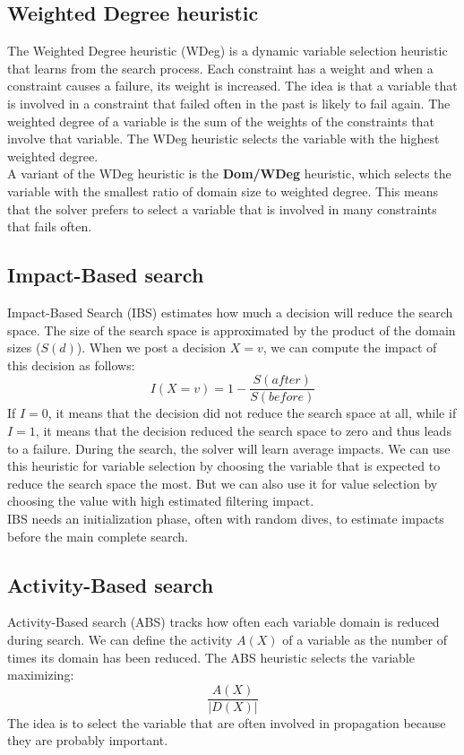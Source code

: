 \documentclass[12pt, openany]{report}
\theoremstyle{definition}
\begin{document}
\subsection{Weighted Degree heuristic}
The Weighted Degree heuristic (WDeg) is a dynamic variable selection heuristic that learns from the search process. Each constraint has a weight and when a constraint causes a failure, its weight is increased. The idea is that a variable that is involved in a constraint that failed often in the past is likely to fail again. The weighted degree of a variable is the sum of the weights of the constraints that involve that variable. The WDeg heuristic selects the variable with the highest weighted degree.\\
A variant of the WDeg heuristic is the \textbf{Dom/WDeg} heuristic, which selects the variable with the smallest ratio of domain size to weighted degree. This means that the solver prefers to select a variable that is involved in many constraints that fails often. 
\subsection{Impact-Based search}
Impact-Based Search (IBS) estimates how much a decision will reduce the search space. The size of the search space is approximated by the product of the domain sizes ($S(d)$). When we post a decision $X = v$, we can compute the impact of this decision as follows:
\begin{equation}
    I(X = v) = 1 - \frac{S(after)}{S(before)}
\end{equation}
If $I = 0$, it means that the decision did not reduce the search space at all, while if $I = 1$, it means that the decision reduced the search space to zero and thus leads to a failure. During the search, the solver will learn average impacts. We can use this heuristic for variable selection by choosing the variable that is expected to reduce the search space the most. But we can also use it for value selection by choosing the value with high estimated filtering impact.\\
IBS needs an initialization phase, often with random dives, to estimate impacts before the main complete search.
\subsection{Activity-Based search}
Activity-Based search (ABS) tracks how often each variable domain is reduced during search. We can define the activity $A(X)$ of a variable as the number of times its domain has been reduced. The ABS heuristic selects the variable maximizing:
\begin{equation}
    \frac{A(X)}{|D(X)|}
\end{equation}
The idea is to select the variable that are often involved in propagation because they are probably important.
\end{document}
